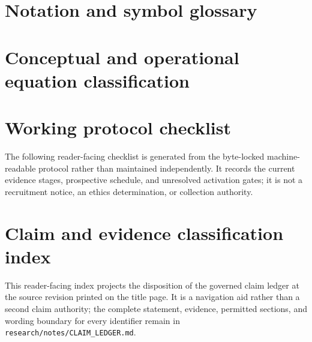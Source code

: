 \section{Notation and symbol glossary}
\label{app:notation-glossary}



\section{Conceptual and operational equation classification}
\label{app:equation-classification}



\section{Working protocol checklist}
\label{app:working-protocol-checklist}

The following reader-facing checklist is generated from the byte-locked
machine-readable protocol rather than maintained independently. It records the
current evidence stages, prospective schedule, and unresolved activation gates;
it is not a recruitment notice, an ethics determination, or collection
authority.



\section{Claim and evidence classification index}
\label{app:claim-evidence-index}

This reader-facing index projects the disposition of the governed claim ledger
at the source revision printed on the title page. It is a navigation aid rather
than a second claim authority; the complete statement, evidence, permitted
sections, and wording boundary for every identifier remain in
\texttt{research/notes/CLAIM\_LEDGER.md}.

